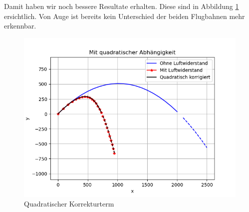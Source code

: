 Damit haben wir noch bessere Resultate erhalten. Diese sind in Abbildung \ref{naive_quadratic_term} ersichtlich. Von Auge ist bereits kein Unterschied der beiden Flugbahnen mehr erkennbar.
\begin{figure}
    \centering
    \includegraphics[scale = 0.7]{papers/perturbation/bilder/img2.png}
    \caption{Quadratischer Korrekturterm}
	\label{naive_quadratic_term}
\end{figure}